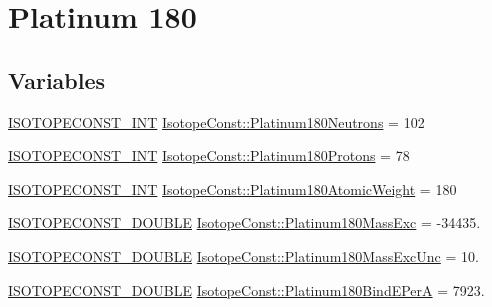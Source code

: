 \hypertarget{group___isotope_const-_platinum-_pt180}{}\section{Platinum 180}
\label{group___isotope_const-_platinum-_pt180}
\subsection*{Variables}
\begin{DoxyCompactItemize}
\item 
\mbox{\hyperlink{group___isotope_const-_macros_ga5f18360b3e99483a35c32d789e62621c}{I\+S\+O\+T\+O\+P\+E\+C\+O\+N\+S\+T\+\_\+\+I\+NT}} \mbox{\hyperlink{group___isotope_const-_platinum-_pt180_gae7256b35cf23268e8aede6d1fcbbb833}{Isotope\+Const\+::\+Platinum180\+Neutrons}} = 102
\item 
\mbox{\hyperlink{group___isotope_const-_macros_ga5f18360b3e99483a35c32d789e62621c}{I\+S\+O\+T\+O\+P\+E\+C\+O\+N\+S\+T\+\_\+\+I\+NT}} \mbox{\hyperlink{group___isotope_const-_platinum-_pt180_ga711913171a8064edbc1a3cc6686bf6ce}{Isotope\+Const\+::\+Platinum180\+Protons}} = 78
\item 
\mbox{\hyperlink{group___isotope_const-_macros_ga5f18360b3e99483a35c32d789e62621c}{I\+S\+O\+T\+O\+P\+E\+C\+O\+N\+S\+T\+\_\+\+I\+NT}} \mbox{\hyperlink{group___isotope_const-_platinum-_pt180_gaf49778b22e65ca505c266e6a89398e61}{Isotope\+Const\+::\+Platinum180\+Atomic\+Weight}} = 180
\item 
\mbox{\hyperlink{group___isotope_const-_macros_ga8f45a7272ce02c0b4c65c44636ed719a}{I\+S\+O\+T\+O\+P\+E\+C\+O\+N\+S\+T\+\_\+\+D\+O\+U\+B\+LE}} \mbox{\hyperlink{group___isotope_const-_platinum-_pt180_gaab2fe62e9a671da418b91487225f8993}{Isotope\+Const\+::\+Platinum180\+Mass\+Exc}} = -\/34435.
\item 
\mbox{\hyperlink{group___isotope_const-_macros_ga8f45a7272ce02c0b4c65c44636ed719a}{I\+S\+O\+T\+O\+P\+E\+C\+O\+N\+S\+T\+\_\+\+D\+O\+U\+B\+LE}} \mbox{\hyperlink{group___isotope_const-_platinum-_pt180_ga537142d28688f0926a569ecf75a6e1c2}{Isotope\+Const\+::\+Platinum180\+Mass\+Exc\+Unc}} = 10.
\item 
\mbox{\hyperlink{group___isotope_const-_macros_ga8f45a7272ce02c0b4c65c44636ed719a}{I\+S\+O\+T\+O\+P\+E\+C\+O\+N\+S\+T\+\_\+\+D\+O\+U\+B\+LE}} \mbox{\hyperlink{group___isotope_const-_platinum-_pt180_gae60816c333972bf5becf592c55c9bc8d}{Isotope\+Const\+::\+Platinum180\+Bind\+E\+PerA}} = 7923.
\item 

\end{DoxyCompactItemize}
